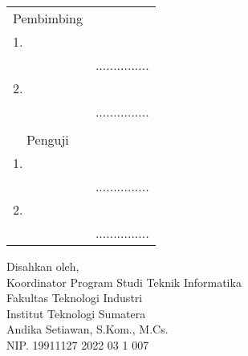 \begin{center}
	\justify
    \setlength{\tabcolsep}{0pt}
    \begin{tabular}{ m{0.5cm}  m{} >{\centering\arraybackslash}m{}}
        \multicolumn{2}{c}{\hspace*{70pt}Pembimbing} & \multicolumn{1}{c}{} \\[2pt]
		1. & \printnamadosbinga & \\
		 & \printnipdosbinga & ............... \\[4pt]
		2. & \printnamadosbingb & \\
		 & \printnipdosbingb & ............... \\
		 & \\
		\multicolumn{2}{c}{\hspace*{70pt}Penguji} & \multicolumn{1}{c}{} \\[2pt]
		1. & \printnamapengujia & \\
		& \printnippengujia & ............... \\[4pt]
		2. & \printnamapengujib & \\
		& \printnippengujib & ............... \\
    \end{tabular}

	\begin{center}
		\fontsize{10pt}{10pt}
        \vspace{0.45cm}
		Disahkan oleh,\\
		Koordinator Program Studi Teknik Informatika\\
		Fakultas Teknologi Industri\\
		Institut Teknologi Sumatera
		\vspace{1.8cm}\\
		Andika Setiawan, S.Kom., M.Cs. \\ %
		NIP. 19911127 2022 03 1 007 \\
	\end{center}
	\vfill

\end{center}
\clearpage